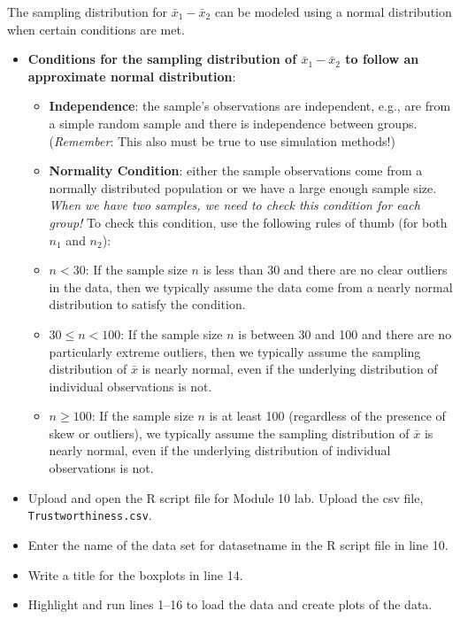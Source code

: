 \documentclass[
]{report}
\begin{document}
\vspace{0.8in}

The sampling distribution for \(\bar{x}_1-\bar{x}_2\) can be modeled using a normal distribution when certain conditions are met.

\begin{itemize}
\item
  \textbf{Conditions for the sampling distribution of \(\bar{x}_1 - \bar{x}_2\) to follow an approximate normal distribution}:

  \begin{itemize}
  \item
    \textbf{Independence}: the sample's observations are independent, e.g., are from a simple random sample and there is independence between groups. (\emph{Remember}: This also must be true to use simulation methods!)
  \item
    \textbf{Normality Condition}: either the sample observations come from a normally distributed population or we have a large enough sample size. \emph{When we have two samples, we need to check this condition for each group!} To check this condition, use the following rules of thumb (for both \(n_1\) and \(n_2\)):
  \item
    \(n < 30\): If the sample size \(n\) is less than 30 and there are no clear outliers in the data, then we typically assume the data come from a nearly normal distribution to satisfy the condition.
  \item
    \(30 \le n < 100\): If the sample size \(n\) is between 30 and 100 and there are no particularly extreme outliers, then we typically assume the sampling distribution of \(\bar{x}\) is nearly normal, even if the underlying distribution of individual observations is not.
  \item
    \(n \geq 100\): If the sample size \(n\) is at least 100 (regardless of the presence of skew or outliers), we typically assume the sampling distribution of \(\bar{x}\) is nearly normal, even if the underlying distribution of individual observations is not.
  \end{itemize}
\item
  Upload and open the R script file for Module 10 lab. Upload the csv file, \texttt{Trustworthiness.csv}.
\item
  Enter the name of the data set for datasetname in the R script file in line 10.
\item
  Write a title for the boxplots in line 14.
\item
  Highlight and run lines 1--16 to load the data and create plots of the data.
\end{itemize}
\end{document}
